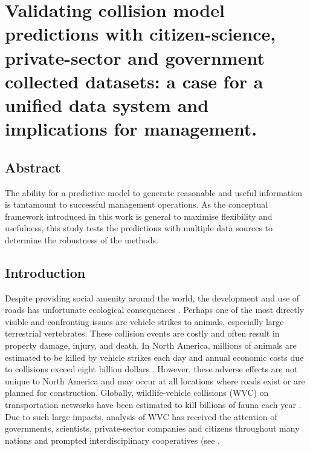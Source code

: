 \chapter{Validating collision model predictions with citizen-science, private-sector and government collected datasets: a case for a unified data system and implications for management.}\label{sec:val}
\newpage

\begin{localsize}{10}
\section*{\centering Abstract}

The ability for a predictive model to generate reasonable and useful information is tantamount to successful management operations.  As the conceptual framework introduced in this work is general to maximise flexibility and usefulness, this study tests the predictions with multiple data sources to determine the robustness of the methods.

\end{localsize}

\newpage
\section{Introduction}

Despite providing social amenity around the world, the development and use of roads has unfortunate ecological consequences \citep{form03}. Perhaps one of the most directly visible and confronting issues are vehicle strikes to animals, especially large terrestrial vertebrates. These collision events are costly and often result in property damage, injury, and death. In North America, millions of animals are estimated to be killed by vehicle strikes each day \citep{form98} and annual economic costs due to collisions exceed eight billion dollars \citep{huij07}. However, these adverse effects are not unique to North America and may occur at all locations where roads exist or are planned for construction.  Globally, wildlife-vehicle collisions (WVC) on transportation networks have been estimated to kill billions of fauna each year \citep{seil06}. Due to such large impacts, analysis of WVC has received the attention of governments, scientists, private-sector companies and citizens throughout many nations and prompted interdisciplinary cooperatives (see \cite{rvdr15}.

